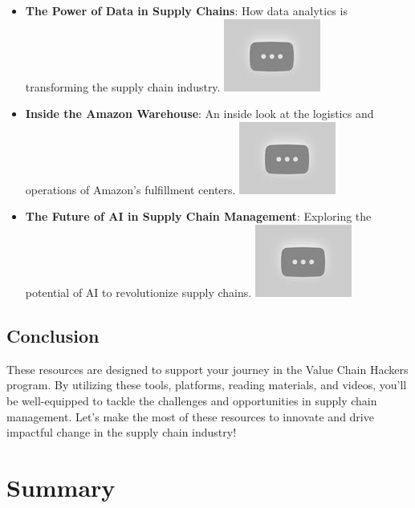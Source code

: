 \documentclass[
  letterpaper,
  DIV=11,
  numbers=noendperiod]{scrreprt}
\begin{document}
\begin{itemize}
\item
  \textbf{The Power of Data in Supply Chains}: How data analytics is
  transforming the supply chain industry.
  \href{https://www.youtube.com/watch?v=U6YbVwX3v0Y}{\includegraphics{index_files/mediabag/0123456.jpg}}
\item
  \textbf{Inside the Amazon Warehouse}: An inside look at the logistics
  and operations of Amazon's fulfillment centers.
  \href{https://www.youtube.com/watch?v=SzdbKz5CyhA}{\includegraphics{index_files/mediabag/01234567.jpg}}
\item
  \textbf{The Future of AI in Supply Chain Management}: Exploring the
  potential of AI to revolutionize supply chains.
  \href{https://www.youtube.com/watch?v=2WjA8MsN9Bc}{\includegraphics{index_files/mediabag/012345678.jpg}}
\end{itemize}

\section{Conclusion}\label{conclusion-6}

These resources are designed to support your journey in the Value Chain
Hackers program. By utilizing these tools, platforms, reading materials,
and videos, you'll be well-equipped to tackle the challenges and
opportunities in supply chain management. Let's make the most of these
resources to innovate and drive impactful change in the supply chain
industry!


\chapter{Summary}\label{summary}
\end{document}
